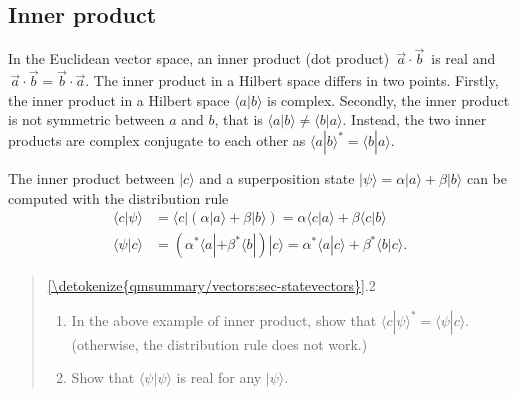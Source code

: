\documentclass[letterpaper,10pt,english]{jupyterBook}
\begin{document}
\subsection{Inner product}
\label{\detokenize{qmsummary/vectors:inner-product}}\label{\detokenize{qmsummary/vectors:subsec-innerproduct}}
\sphinxAtStartPar
In the Euclidean vector space, an inner product (dot product) \(\,\vec{a} \cdot \vec{b}\,\) is real and \(\,\vec{a} \cdot \vec{b} = \vec{b} \cdot \vec{a}\). The inner product in a Hilbert space differs in two points. Firstly, the inner product in a Hilbert space \(\langle a|b \rangle\) is complex.  Secondly, the inner product is not symmetric between \(a\) and \(b\), that is \(\langle a|b \rangle \ne \langle b|a \rangle\). Instead, the two inner products are complex conjugate to each other as \(\langle a|b \rangle^* = \langle b|a \rangle\).

\sphinxAtStartPar
The inner product between \(|c \rangle\) and a superposition state \(|\psi \rangle = \alpha |a \rangle + \beta |b \rangle\) can be computed with the distribution rule
\begin{align}
\langle c|\psi \rangle &= \langle c| \left(\alpha |a \rangle + \beta |b \rangle\right) = \alpha \langle c|a \rangle + \beta \langle c|b \rangle\\
\langle \psi|c \rangle &= \left(\alpha^* \langle a | + \beta^* \langle b |\right) | c \rangle = \alpha^* \langle a|c \rangle + \beta^* \langle b|c \rangle.
\end{align}
\begin{quote}

\sphinxAtStartPar
{} \hyperref[\detokenize{qmsummary/vectors:sec-statevectors}]{\ref{\detokenize{qmsummary/vectors:sec-statevectors}}}.2
\begin{enumerate}
%
\item {}
\sphinxAtStartPar
In the above example of inner product, show that \(\langle c|\psi \rangle^* = \langle \psi|c \rangle\). (otherwise, the distribution rule does not work.)

\item {}
\sphinxAtStartPar
Show that \(\langle \psi|\psi \rangle\) is real  for any \(|\psi\rangle\).

\end{enumerate}
\end{quote}
\end{document}
